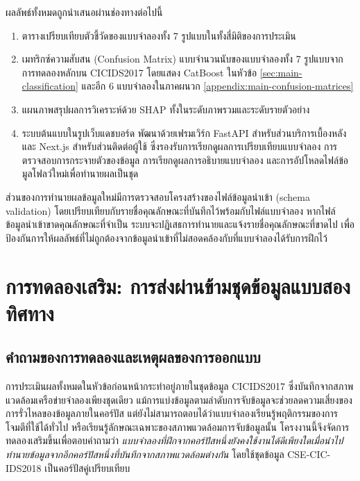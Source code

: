 ผลลัพธ์ทั้งหมดถูกนำเสนอผ่านช่องทางต่อไปนี้

\begin{enumerate}
    \item ตารางเปรียบเทียบตัวชี้วัดของแบบจำลองทั้ง 7 รูปแบบในทั้งสี่มิติของการประเมิน
    \item เมทริกซ์ความสับสน (Confusion Matrix) แบบจำนวนนับของแบบจำลองทั้ง 7 รูปแบบจากการทดลองหลักบน CICIDS2017 โดยแสดง CatBoost ในหัวข้อ \ref{sec:main-classification} และอีก 6 แบบจำลองในภาคผนวก \ref{appendix:main-confusion-matrices}
    \item แผนภาพสรุปผลการวิเคราะห์ด้วย SHAP ทั้งในระดับภาพรวมและระดับรายตัวอย่าง
    \item ระบบต้นแบบในรูปเว็บแดชบอร์ด พัฒนาด้วยเฟรมเวิร์ก FastAPI สำหรับส่วนบริการเบื้องหลัง และ Next.js สำหรับส่วนติดต่อผู้ใช้ ซึ่งรองรับการเรียกดูผลการเปรียบเทียบแบบจำลอง การตรวจสอบการกระจายตัวของข้อมูล การเรียกดูผลการอธิบายแบบจำลอง และการอัปโหลดไฟล์ข้อมูลโฟลว์ใหม่เพื่อทำนายผลเป็นชุด
\end{enumerate}

ส่วนของการทำนายผลข้อมูลใหม่มีการตรวจสอบโครงสร้างของไฟล์ข้อมูลนำเข้า (schema validation) โดยเปรียบเทียบกับรายชื่อคุณลักษณะที่บันทึกไว้พร้อมกับไฟล์แบบจำลอง หากไฟล์ข้อมูลนำเข้าขาดคุณลักษณะที่จำเป็น ระบบจะปฏิเสธการทำนายและแจ้งรายชื่อคุณลักษณะที่ขาดไป เพื่อป้องกันการให้ผลลัพธ์ที่ไม่ถูกต้องจากข้อมูลนำเข้าที่ไม่สอดคล้องกับที่แบบจำลองได้รับการฝึกไว้

\section{การทดลองเสริม: การส่งผ่านข้ามชุดข้อมูลแบบสองทิศทาง}
\label{sec:crossdataset}

\subsection{คำถามของการทดลองและเหตุผลของการออกแบบ}

การประเมินผลทั้งหมดในหัวข้อก่อนหน้ากระทำอยู่ภายในชุดข้อมูล CICIDS2017 ซึ่งบันทึกจากสภาพแวดล้อมเครือข่ายจำลองเพียงชุดเดียว แม้การแบ่งข้อมูลตามลำดับการจับข้อมูลจะช่วยลดความเสี่ยงของการรั่วไหลของข้อมูลภายในคอร์ปัส แต่ยังไม่สามารถตอบได้ว่าแบบจำลองเรียนรู้พฤติกรรมของการโจมตีที่ใช้ได้ทั่วไป หรือเรียนรู้ลักษณะเฉพาะของสภาพแวดล้อมการจับข้อมูลนั้น โครงงานนี้จึงจัดการทดลองเสริมขึ้นเพื่อตอบคำถามว่า \emph{แบบจำลองที่ฝึกจากคอร์ปัสหนึ่งยังคงใช้งานได้ดีเพียงใดเมื่อนำไปทำนายข้อมูลจากอีกคอร์ปัสหนึ่งที่บันทึกจากสภาพแวดล้อมต่างกัน} โดยใช้ชุดข้อมูล CSE-CIC-IDS2018 เป็นคอร์ปัสคู่เปรียบเทียบ

